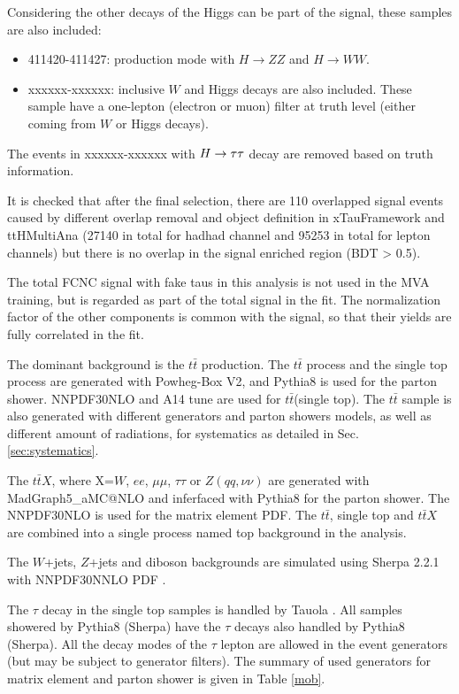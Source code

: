 Considering the other decays of the Higgs can be part of the signal, these samples are also included:

\begin{itemize}
	\item 411420-411427: production mode with $H\to ZZ$ and $H\to WW$.
	\item xxxxxx-xxxxxx: inclusive $W$ and Higgs decays are also included. These sample have a one-lepton (electron or muon) filter at truth level (either coming from $W$ or Higgs decays).
\end{itemize}

The events in xxxxxx-xxxxxx with $H \rightarrow \tau\tau$ decay are removed based on truth information.

It is checked that after the final selection, there are 110 overlapped signal events caused by different overlap removal and object definition in xTauFramework and ttHMultiAna (27140 in total for hadhad channel and 95253 in total for lepton channels) but there is no overlap in the signal enriched region (BDT > 0.5).

The total FCNC signal with fake taus in this analysis is not used in the MVA training, but is regarded as part of the total signal in the fit. The normalization factor of the other components is common with the signal, so that their yields are fully correlated in the fit.

The dominant background is the $t\bar{t}$ production. The $t\bar{t}$ process and the single top process are generated with Powheg-Box \cite{Powheg} V2, and Pythia8 is used for the parton shower. NNPDF30NLO \cite{NNPDF30NLO} and A14 tune \cite{A14} are used for $t\bar{t}$(single top). The $t\bar{t}$ sample is also generated with different generators and parton showers models, as well as different amount of radiations, for systematics as detailed in Sec. \ref{sec:systematics}.

The $t\bar{t}X$, where X=$W$, $ee$, $\mu\mu$, $\tau\tau$ or $Z(qq,\nu\nu)$ are generated with MadGraph5\_aMC@NLO and inferfaced with Pythia8 for the parton shower. The NNPDF30NLO \cite{NNPDF30NLO} is used for the matrix element PDF. The $t\bar{t}$, single top and $t\bar{t}X$ are combined into a single process named top background in the analysis.

The $W$+jets, $Z$+jets and diboson backgrounds are simulated using Sherpa 2.2.1 \cite{Sherpa} with NNPDF30NNLO PDF \cite{NNPDF30NLO}.

The $\tau$ decay in the single top samples is handled by Tauola \cite{Tauola}. All samples showered by Pythia8 (Sherpa) have the $\tau$ decays also handled by Pythia8 (Sherpa). All the decay modes of the $\tau$ lepton are allowed in the event generators (but may be subject to generator filters). The summary of used generators for matrix element and parton shower is given in Table \ref{mob}.

